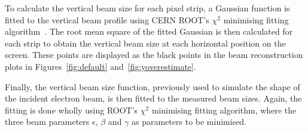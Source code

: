To calculate the vertical beam size for each pixel strip, a Gaussian function is
fitted to the vertical beam profile using CERN ROOT's \(\chi^2\) minimising
fitting algorithm~\cite{Brun:1997pa}.
The root mean square of the fitted
Gaussian is then calculated for each strip to obtain the vertical beam size at
each horizontal position on the screen. These points are displayed as the black
points in the beam reconstruction plots in Figures~\ref{fig:default}
and~\ref{fig:yoverestimate}.

Finally, the vertical beam size function, previously used to simulate the shape
of the incident electron beam, is then fitted to the measured beam sizes. Again,
the fitting is done wholly using ROOT's \(\chi^2\) minimising fitting algorithm,
where the three beam parameters \(\epsilon\), \(\beta\) and \(\gamma\) as
parameters to be minimised.

